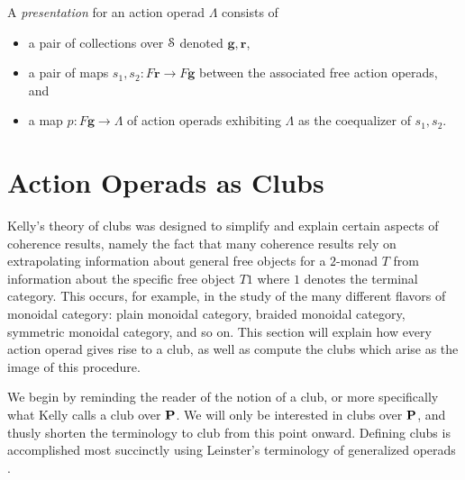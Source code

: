 \begin{Defi}
  A \textit{presentation} for an action operad $\Lambda$ consists of
  \begin{itemize}
    \item a pair of collections over $\mathcal{S}$ denoted $\mathbf{g}, \mathbf{r}$,
    \item a pair of maps $s_{1}, s_{2} \colon F\mathbf{r} \rightarrow F\mathbf{g}$ between the associated free action operads, and
    \item a map $p \colon F\mathbf{g} \rightarrow \Lambda$ of action operads exhibiting $\Lambda$ as the coequalizer of $s_{1},s_{2}$.
  \end{itemize}
\end{Defi}

\section{Action Operads as Clubs}

Kelly's theory of clubs \cite{kelly_club1, kelly_club0, kelly_club2} was designed to simplify and explain certain aspects of coherence results, namely the fact that many coherence results rely on extrapolating information about general free objects for a $2$-monad $T$ from information about the specific free object $T1$ where $1$ denotes the terminal category. This occurs, for example, in the study of the many different flavors of monoidal category:  plain monoidal category, braided monoidal category, symmetric monoidal category, and so on. This section will explain how every action operad gives rise to a club, as well as compute the clubs which arise as the image of this procedure.

We begin by reminding the reader of the notion of a club, or more specifically what Kelly \cite{kelly_club1,kelly_club2} calls a club over $\mathbf{P}$. We will only be interested in clubs over $\mathbf{P}$, and thusly shorten the terminology to club from this point onward. Defining clubs is accomplished most succinctly using Leinster's terminology of generalized operads \cite{leinster}.

